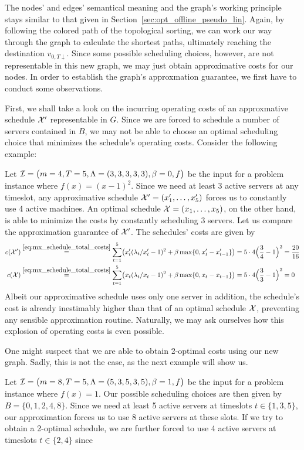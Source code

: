 The nodes' and edges' semantical meaning and the graph's working principle stays similar to that given in Section~\ref{sec:opt_offline_pseudo_lin}. Again, by following the colored path of the topological sorting, we can work our way through the graph to calculate the shortest paths, ultimately reaching the destination $v_{0,T\downarrow}$. Since some possible scheduling choices, however, are not representable in this new graph, we may just obtain approximative costs for our nodes. In order to establish the graph's approxmation guarantee, we first have to conduct some observations.

First, we shall take a look on the incurring operating costs of an approxmative schedule $\mathcal{X}'$ representable in $G$. Since we are forced to schedule a number of servers contained in $B$, we may not be able to choose an optimal scheduling choice that minimizes the schedule's operating costs. Consider the following example:
\begin{exmpl}
Let $\mathcal{I}=\bigl(m=4,T=5,\Lambda=(3,3,3,3,3),\beta=0,f\bigr)$ be the input for a problem instance where $f(x)=(x-1)^2$. Since we need at least 3 active servers at any timeslot, any approximative schedule $\mathcal{X}'=(x_1',\ldots,x_5')$ forces us to constantly use 4 active machines. An optimal schedule $\mathcal{X}=(x_1,\ldots,x_5)$, on the other hand, is able to minimize the costs by constantly scheduling 3 servers. Let us compare the approximation guarantee of $\mathcal{X}'$. The schedules' costs are given by
\begin{align*}
	c(\mathcal{X}')&\stackrel{\eqref{eq:mx_schedule_total_costs}}{=}\sum\limits_{t=1}^{5}\bigl(x_t'(\lambda_t/x_t'-1)^2+\beta\max\{0,x_t'-x_{t-1}'\}\bigr)=5\cdot4\Bigl(\frac{3}{4}-1\Bigr)^2=\frac{20}{16}\\
	c(\mathcal{X})&\stackrel{\eqref{eq:mx_schedule_total_costs}}{=}\sum\limits_{t=1}^{5}\bigl(x_t(\lambda_t/x_t-1)^2+\beta\max\{0,x_t-x_{t-1}\}\bigr)=5\cdot4\Bigl(\frac{3}{3}-1\Bigr)^2=0
\end{align*}
Albeit our approximative schedule uses only one server in addition, the schedule's cost is already inestimably higher than that of an optimal schedule $\mathcal{X}$, preventing any sensible approximation routine. Naturally, we may ask ourselves how this explosion of operating costs is even possible. 
\end{exmpl}

One might suspect that we are able to obtain 2-optimal costs using our new graph. Sadly, this is not the case, as the next example will show us.
\begin{exmpl}
Let $\mathcal{I}=\bigl(m=8,T=5,\Lambda=(5,3,5,3,5),\beta=1,f\bigr)$ be the input for a problem instance where $f(x)=1$. Our possible scheduling choices are then given by $B=\{0,1,2,4,8\}$. Since we need at least 5 active servers at timeslots $t\in\{1,3,5\}$, our approximation forces us to use 8 active servers at these slots. If we try to obtain a 2-optimal schedule, we are further forced to use 4 active servers at timeslots $t\in\{2,4\}$ since 
\end{exmpl}

